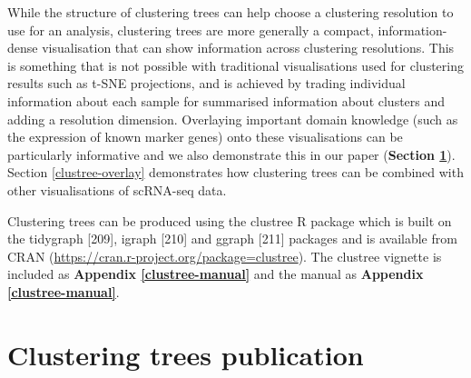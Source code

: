 \documentclass[11pt,a4paper,titlepage,twoside,openright]{style/unimelbthesis}
\theoremstyle{definition}
\theoremstyle{definition}
\theoremstyle{definition}
\theoremstyle{remark}
\begin{document}
\begin{mainmatter}
While the structure of clustering trees can help choose a clustering resolution to use for an analysis, clustering trees are more generally a compact, information-dense visualisation that can show information across clustering resolutions. This is something that is not possible with traditional visualisations used for clustering results such as t-SNE projections, and is achieved by trading individual information about each sample for summarised information about clusters and adding a resolution dimension. Overlaying important domain knowledge (such as the expression of known marker genes) onto these visualisations can be particularly informative and we also demonstrate this in our paper (\textbf{Section \ref{clustree-publication}}). Section \ref{clustree-overlay} demonstrates how clustering trees can be combined with other visualisations of scRNA-seq data.

Clustering trees can be produced using the clustree R package which is built on the tidygraph {[}209{]}, igraph {[}210{]} and ggraph {[}211{]} packages and is available from CRAN (\url{https://cran.r-project.org/package=clustree}). The clustree vignette is included as \textbf{Appendix \ref{clustree-manual}} and the manual as \textbf{Appendix \ref{clustree-manual}}.

\hypertarget{clustree-publication}{%
\section{Clustering trees publication}\label{clustree-publication}}


\end{mainmatter}
\end{document}
